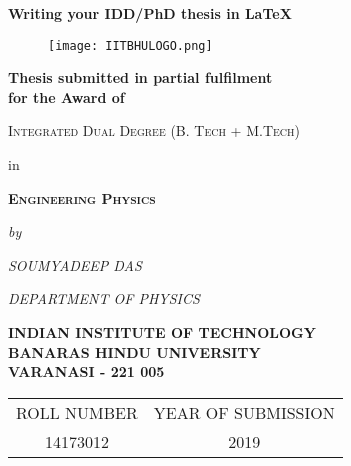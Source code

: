 \begin{titlepage}
	\centering
	{\Large\bfseries Writing your IDD/PhD thesis in \texorpdfstring{\LaTeX}{LaTeX}\par}
	\vspace{2cm}
	
	\begin{figure}[htbp]
    \centering
    \texttt{[image: IITBHULOGO.png]}
\end{figure} 	
	
	\textbf{Thesis submitted in partial fulfilment}\\ 
	\textbf{for the Award of }\\
	{\scshape Integrated Dual Degree (B. Tech + M.Tech)\par}
		{in\par}
		{\scshape \textbf{Engineering Physics}\par}

		\vfill
	{\textit{by}\par}
	{\scshape \textit{SOUMYADEEP DAS}\par}
	\vfill
	{\scshape \textit{DEPARTMENT OF PHYSICS}\par}
	\textbf{INDIAN INSTITUTE OF TECHNOLOGY}\\
	\textbf{BANARAS HINDU UNIVERSITY}\\
	\textbf{VARANASI - 221 005}\\
\vspace{0.6cm}
	\begin{table*} [bthp]
		\centering
	\begin{tabular}{cc}
	ROLL NUMBER	\hspace{6cm} &  YEAR OF SUBMISSION \\ 
	14173012 \hspace{6cm}	& 2019 \\ 
	\end{tabular} 
	\end{table*}

\end{titlepage}